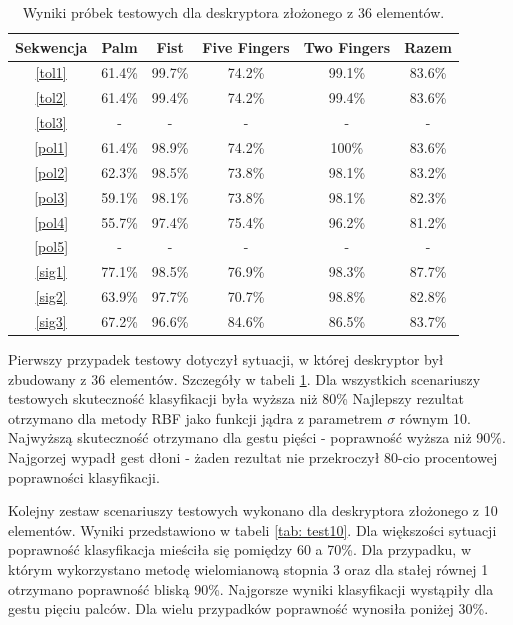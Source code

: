 \begin{table} [h!]
	\centering
	\begin{tabular}{|c|c|c|c|c|c|}
		\hline
		\textbf{Sekwencja} 	& \textbf{Palm} & \textbf{Fist} & \textbf{Five Fingers} & \textbf{Two Fingers} & \textbf{Razem} \\ \hline
		\ref{tol1} 	& 61.4\% 	& 99.7\%	& 74.2\%	& 99.1\% 	& 83.6\% \\ \hline
		\ref{tol2} 	& 61.4\% 	& 99.4\%	& 74.2\%	& 99.4\% 	& 83.6\% \\ \hline
		\ref{tol3}	& -			& -			& -			& - 		& - 	 \\ \hline \hline
		\ref{pol1} 	& 61.4\% 	& 98.9\%	& 74.2\%	& 100\% 	& 83.6\% \\ \hline
		\ref{pol2} 	& 62.3\% 	& 98.5\%	& 73.8\%	& 98.1\% 	& 83.2\% \\ \hline
		\ref{pol3}	& 59.1\%	& 98.1\%	& 73.8\%	& 98.1\% 	& 82.3\% \\ \hline
		\ref{pol4}	& 55.7\%	& 97.4\%	& 75.4\%	& 96.2\% 	& 81.2\% \\ \hline
		\ref{pol5}	& -			& -			& -			& - 		& - 	 \\ \hline \hline
		\ref{sig1}	& 77.1\% 	& 98.5\%	& 76.9\%	& 98.3\% 	& 87.7\% \\ \hline
		\ref{sig2}	& 63.9\% 	& 97.7\%	& 70.7\%	& 98.8\% 	& 82.8\% \\ \hline
		\ref{sig3}	& 67.2\%	& 96.6\%	& 84.6\%	& 86.5\% 	& 83.7\% \\ \hline
	\end{tabular}
	\caption{Wyniki próbek testowych dla deskryptora złożonego z 36 elementów.}
	\label{tab: test36}
\end{table}

Pierwszy przypadek testowy dotyczył sytuacji, w której deskryptor był zbudowany z 36 elementów. Szczegóły w tabeli \ref{tab: test36}. Dla wszystkich scenariuszy testowych skuteczność klasyfikacji była wyższa niż 80\% Najlepszy rezultat otrzymano dla metody RBF jako funkcji jądra z parametrem $\sigma$ równym 10. Najwyższą skuteczność otrzymano dla gestu pięści - poprawność wyższa niż 90\%. Najgorzej wypadł gest dłoni - żaden rezultat nie przekroczył 80-cio procentowej poprawności klasyfikacji.  

Kolejny zestaw scenariuszy testowych wykonano dla deskryptora złożonego z 10 elementów. Wyniki przedstawiono w tabeli \ref{tab: test10}. Dla większości sytuacji poprawność klasyfikacja mieściła się pomiędzy 60 a 70\%. Dla przypadku, w którym wykorzystano metodę wielomianową stopnia 3 oraz dla stałej równej 1 otrzymano poprawność bliską 90\%. Najgorsze wyniki klasyfikacji wystąpiły dla gestu pięciu palców. Dla wielu przypadków poprawność wynosiła poniżej 30\%. 

